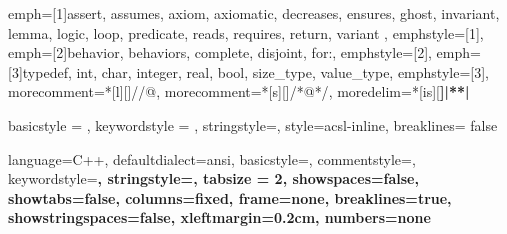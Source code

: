 {
  emph=[1]{assert, assumes, axiom, axiomatic, decreases, ensures,
           ghost, invariant, lemma, logic, loop,
           predicate, reads, requires, return, variant },
  emphstyle=[1]{\bfseries\color{coASCLKeyword}},
  emph=[2]{behavior, behaviors, complete, disjoint, for:},
  emphstyle=[2]{\bfseries\color{coACSLBehavior}},
  emph=[3]{typedef, int, char, integer, real, bool, size_type, value_type},
  emphstyle=[3]{\bfseries\color{coCKeyword}},
  morecomment=*[l][\color{coASCL}]{//@},
  morecomment=*[s][\color{coASCL}]{/*@}{*/},
  moredelim=*[is][\bfseries]{|*}{*|}
}

{
  basicstyle = \ttfamily\small\color{coASCL},
  keywordstyle = \ttfamily\small\color{coASCL},
  stringstyle=\color{coASCL},
  style=acsl-inline,
  breaklines= false
}

\lstset
{%
  language=C++,
  defaultdialect=ansi,
  basicstyle=\small\ttfamily,
  commentstyle=\small\color{darkgreen},
  keywordstyle=\small\bfseries\color{darkblue},
  stringstyle=\small\color{darkgreen},
  tabsize = 2,
  showspaces=false,
  showtabs=false,
  columns=fixed,  
  frame=none,  
  breaklines=true,
  showstringspaces=false,
  xleftmargin=0.2cm,
  numbers=none
}
